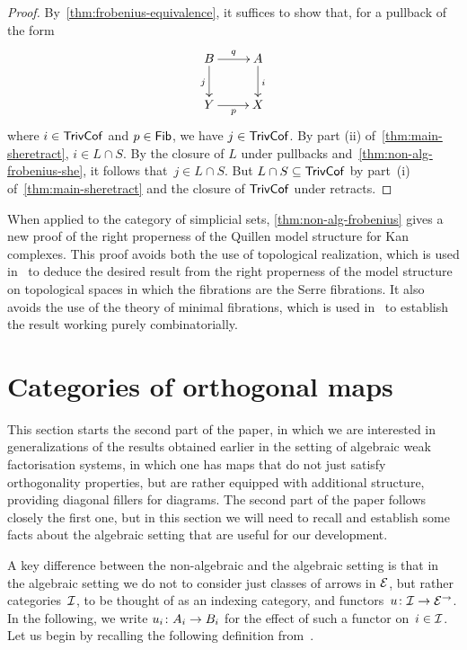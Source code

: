 \documentclass[reqno,10pt,a4paper,oneside,draft]{amsart}
\begin{document}
{{\begin{proof} By~\cref{thm:frobenius-equivalence}, it suffices to show that, for a pullback of the form
\begin{equation*}
\begin{gathered}
\xymatrix{
 B \ar[d]_j \ar[r]^q & A \ar[d]^i \\ 
Y \ar[r]_p & X }
\end{gathered}
\end{equation*}
where $i  \in \TrivCof$ and  $p \in \Fib$, we have $j \in \TrivCof$. 
By part (ii) of~\cref{thm:main-sheretract}, $i \in L \cap S$. By the closure of $L$ under pullbacks and~\cref{thm:non-alg-frobenius-she},
it follows that~$j \in L \cap S$. But $L \cap S \subseteq \TrivCof$ by part~(i) of~\cref{thm:main-sheretract} and 
the closure of $\TrivCof$ under retracts.
\end{proof}



When applied to the category of simplicial sets, \cref{thm:non-alg-frobenius} gives a new proof of the right properness of the Quillen model structure for Kan complexes. This proof avoids both the use of topological realization, which is used in~\cite[Theorem~13.1.13]{hirschhorn-model-localizations} to deduce the desired result from the right properness of the model structure on topological spaces in which the fibrations are the Serre fibrations. It also avoids the use of the theory of minimal fibrations, which is used in~\cite[Theorem~1.7.1]{joyal-tierney-notes} to establish the result working purely combinatorially.




\newpage

\section{Categories of orthogonal maps}
\label{sec:ortf}

This section starts the second part of the paper, in which we are interested in generalizations of the results obtained earlier in the setting
of algebraic weak factorisation systems, in which one has maps that do not just satisfy orthogonality properties, but are rather equipped
with additional structure, providing diagonal fillers for diagrams. The second part of the paper follows closely the first one, but in this section
we will need to recall and establish some facts about the algebraic setting that are useful for our development. 

A key difference between the non-algebraic and the algebraic setting is that in the algebraic setting we do not to consider just classes of arrows in $\catE$, but rather categories~$\cal{I}$, to be thought of as an indexing category, and functors~$u \co \cal{I} \to \catE^\to$. In the following, we write $u_i \co A_i \to B_i$ for the effect of such a functor on~$i \in \cal{I}$.  Let us begin by recalling the following definition from~\cite{garner:small-object-argument}.

}}
\end{document}
